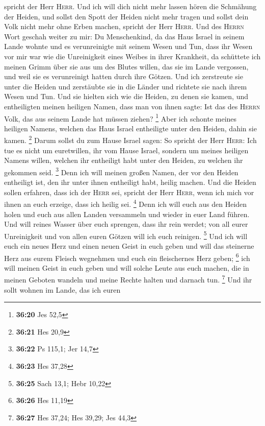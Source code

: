spricht der Herr \textsc{Herr}.  Und ich will dich nicht
mehr lassen hören die Schmähung der Heiden, und sollst den Spott der
Heiden nicht mehr tragen und sollst dein Volk nicht mehr ohne Erben
machen, spricht der Herr \textsc{Herr}.  Und des
\textsc{Herrn} Wort geschah weiter zu mir:  Du
Menschenkind, da das Haus Israel in seinem Lande wohnte und es
verunreinigte mit seinem Wesen und Tun, dass ihr Wesen vor mir war wie
die Unreinigkeit eines Weibes in ihrer Krankheit,  da
schüttete ich meinen Grimm über sie aus um des Blutes willen, das sie im
Lande vergossen, und weil sie es verunreinigt hatten durch ihre Götzen.
 Und ich zerstreute sie unter die Heiden und zerstäubte
sie in die Länder und richtete sie nach ihrem Wesen und Tun.
 Und sie hielten sich wie die Heiden, zu denen sie kamen,
und entheiligten meinen heiligen Namen, dass man von ihnen sagte: Ist
das des \textsc{Herrn} Volk, das aus seinem Lande hat müssen ziehen?
\footnote{\textbf{36:20} Jes 52,5}  Aber ich schonte
meines heiligen Namens, welchen das Haus Israel entheiligte unter den
Heiden, dahin sie kamen. \footnote{\textbf{36:21} Hes 20,9}
 Darum sollst du zum Hause Israel sagen: So spricht der
Herr \textsc{Herr}: Ich tue es nicht um euretwillen, ihr vom Hause
Israel, sondern um meines heiligen Namens willen, welchen ihr entheiligt
habt unter den Heiden, zu welchen ihr gekommen seid. \footnote{\textbf{36:22}
  Ps 115,1; Jer 14,7}  Denn ich will meinen großen Namen,
der vor den Heiden entheiligt ist, den ihr unter ihnen entheiligt habt,
heilig machen. Und die Heiden sollen erfahren, dass ich der
\textsc{Herr} sei, spricht der Herr \textsc{Herr}, wenn ich mich vor
ihnen an euch erzeige, dass ich heilig sei. \footnote{\textbf{36:23} Hes
  37,28}  Denn ich will euch aus den Heiden holen und
euch aus allen Landen versammeln und wieder in euer Land führen.
 Und will reines Wasser über euch sprengen, dass ihr rein
werdet; von all eurer Unreinigkeit und von allen euren Götzen will ich
euch reinigen. \footnote{\textbf{36:25} Sach 13,1; Hebr 10,22}
 Und ich will euch ein neues Herz und einen neuen Geist
in euch geben und will das steinerne Herz aus eurem Fleisch wegnehmen
und euch ein fleischernes Herz geben; \footnote{\textbf{36:26} Hes 11,19}
 ich will meinen Geist in euch geben und will solche
Leute aus euch machen, die in meinen Geboten wandeln und meine Rechte
halten und darnach tun. \footnote{\textbf{36:27} Hes 37,24; Hes 39,29;
  Jes 44,3}  Und ihr sollt wohnen im Lande, das ich euren
